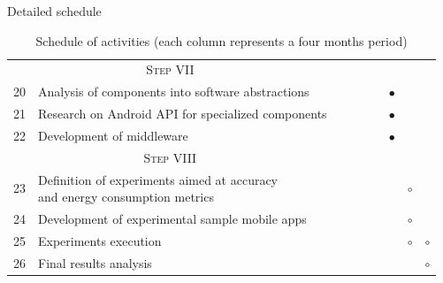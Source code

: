 \documentclass[8pt,xcolor={dvipsnames},handout]{beamer}
\newcommand{\markdone}{\textcolor{PineGreen}{$\bullet$}}
\newcommand{\markonprogress}{\textcolor{colorAzulBienBonito}{$\bullet$}}
\newcommand{\markoff}{\textcolor{PineGreen}{$\circ$}}
\begin{document}
\begin{frame}{Detailed schedule}
\begin{table}[]
{\begin{tabular}{clccccccc}
\multicolumn{2}{c}{\textsc{Step VII}}                                               &  &  &  &  &  &  & \\
20  & Analysis of components into software abstractions                             &  &  &  &  & \markdone  &  & \\
21  & Research on Android API for specialized components                            &  &  &  &  & \markdone  &  & \\
22  & Development of middleware                                                     &  &  &  &  & \markonprogress  &  & \vspace{1em}\\

\multicolumn{2}{c}{\textsc{Step VIII}}                                              &  &  &  &  &  &  & \\
23  & \makecell[l]{Definition of experiments aimed at accuracy\\and energy consumption metrics}    &  &  &  &  &  & \markoff & \\
24  & Development of experimental sample mobile apps                                &  &  &  &  &  & \markoff & \\
25  & Experiments execution                                                         &  &  &  &  &  & \markoff & \markoff  \\
26  & Final results analysis                                                              &  &  &  &  &  &  & \markoff \\
\bottomrule
\end{tabular}%
}
\caption{Schedule of activities (each column represents a four months period)}
\label{tbl:schedule-part-two}
\end{table}
\end{frame}
\end{document}
